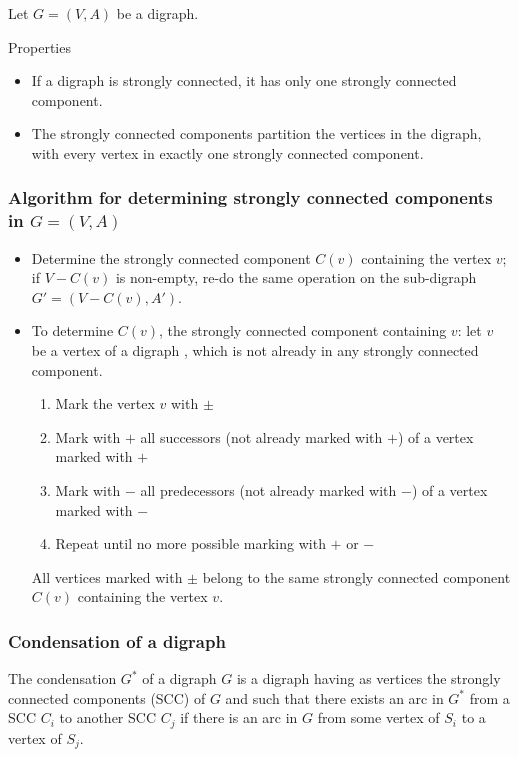 \documentclass[aspectratio=169]{beamer}
\begin{document}
\begin{frame}
	Let $G=(V,A)$ be a digraph.

	\begin{theorem}{Properties}
	\begin{itemize}
	\item If a digraph is strongly connected, it has only one strongly connected component.
	\item The strongly connected components partition the vertices in the digraph, with every vertex in exactly one strongly connected component.
	\end{itemize}
	\end{theorem}
\end{frame}



\begin{frame}\frametitle{Algorithm for determining strongly connected components in $G=(V,A)$}
	\begin{itemize}
	\item Determine the strongly connected component $C(v)$ containing the vertex $v$; if $V-C(v)$ is non-empty, re-do the same operation on the sub-digraph $G'=(V-C(v),A')$.
	\item To determine $C(v)$, the strongly connected component containing $v$: let $v$ be a vertex of a digraph , which is not already in any strongly connected component. 
	\begin{enumerate}
	\item Mark the vertex $v$ with $\pm$
	\item Mark with $+$ all successors (not already marked with $+$) of a vertex marked with $+$
	\item Mark with $-$ all predecessors (not already marked with $-$) of a vertex marked with $-$
	\item Repeat until no more possible marking with $+$ or $-$
	\end{enumerate}
	All vertices marked with $\pm$ belong to the same strongly connected component $C(v)$ containing the vertex $v$.
	\end{itemize}
\end{frame}

\begin{frame}\frametitle{Condensation of a digraph}
	\begin{definition}
		The condensation $G^*$ of a digraph $G$ is a digraph having as vertices the strongly connected components (SCC) of $G$ and such that there exists an arc in $G^*$ from a SCC $C_i$ to another SCC $C_j$ if there is an arc in $G$ from some vertex of $S_i$ to a vertex of $S_j$.
	\end{definition}
\end{frame}
\end{document}
